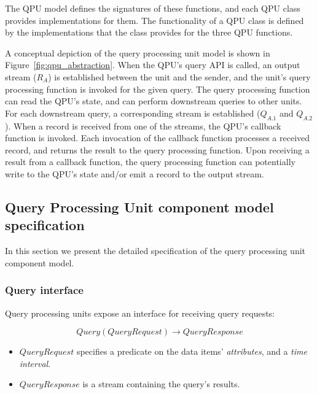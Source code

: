 The QPU model defines the signatures of these functions, and each QPU class provides implementations for them.
The functionality of a QPU class is defined by the implementations that the class provides for the three QPU functions.

\bigskip

A conceptual depiction of the query processing unit model is shown in Figure~\ref{fig:qpu_abstraction}.
When the QPU's query API is called, an output stream ($R_A$) is established between the unit and the sender,
and the unit's query processing function is invoked for the given query.
The query processing function can read the QPU's state, and can perform downstream queries to other units.
For each downstream query, a corresponding stream is established ($Q_{A.1}$ and $Q_{A.2}$).
When a record is received from one of the streams, the QPU's callback function is invoked.
Each invocation of the callback function processes a received record, and returns the result to the query processing
function.
Upon receiving a result from a callback function,
the query processing function can potentially write to the QPU's state and/or emit a record to the output stream.


\subsection{Query Processing Unit component model specification}
\label{ref:specification}

In this section we present the detailed specification of the query processing unit component model.

\subsubsection{Query interface}
\label{ref:query_interface}

Query processing units expose an interface for receiving query requests:

\begin{displaymath}
  Query(QueryRequest) \rightarrow QueryResponse
\end{displaymath}

\begin{itemize}
  \item $QueryRequest$ specifies a predicate on the data items' \textit{attributes}, and a \textit{time interval}.

  \item $QueryResponse$ is a stream containing the query's results.
\end{itemize}

